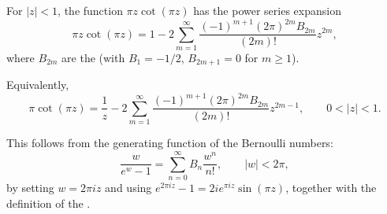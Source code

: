 \begin{proposition} \label{proposition:cotangent_expansion_bernoulli_numbers}
For $|z| < 1$, the function $\pi z \cot(\pi z)$ has the power series expansion
$$
\pi z \cot(\pi z) = 1 - 2 \sum_{m=1}^\infty \frac{(-1)^{m+1} (2\pi)^{2m} B_{2m}}{(2m)!} z^{2m},
$$
where $B_{2m}$ are the  (with $B_1 = -1/2$, $B_{2m+1} = 0$ for $m \ge 1$).

Equivalently,
$$
\pi \cot(\pi z) = \frac{1}{z} - 2 \sum_{m=1}^\infty \frac{(-1)^{m+1} (2\pi)^{2m} B_{2m}}{(2m)!} z^{2m-1}, \qquad 0 < |z| < 1.
$$

This follows from the generating function of the Bernoulli numbers:
$$
\frac{w}{e^w - 1} = \sum_{n=0}^\infty B_n \frac{w^n}{n!}, \qquad |w| < 2\pi,
$$
by setting $w = 2\pi i z$ and using $e^{2\pi i z} - 1 = 2i e^{\pi i z} \sin(\pi z)$, together with the definition of the .
\end{proposition}

